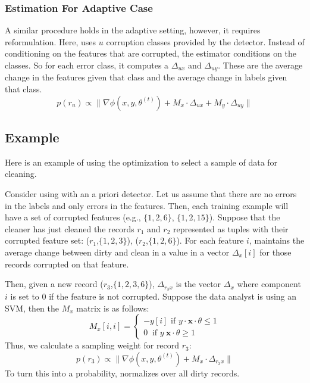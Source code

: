 \subsubsection{Estimation For Adaptive Case}
A similar procedure holds in the adaptive setting, however, it requires reformulation.
Here, \sys uses $u$ corruption classes provided by the detector.
Instead of conditioning on the features that are corrupted, the estimator conditions on the classes.
So for each error class, it computes a $\Delta_{ux}$ and $\Delta_{uy}$.
These are the average change in the features given that class and the average change in labels given that class.
\[
p(r_u)\propto\|\nabla\phi(x,y,\theta^{(t)}) + M_x \cdot \Delta_{ux} +  M_y \cdot \Delta_{uy}\|
\] 

\subsection{Example}
Here is an example of using the optimization to select a sample of data for cleaning.
\begin{example}
Consider using \sys with an a priori detector.
Let us assume that there are no errors in the labels and only errors in the features.
Then, each training example will have a set of corrupted features (e.g., $\{1,2,6\}$, $\{1,2,15\}$).
Suppose that the cleaner has just cleaned the records $r_1$ and $r_2$ represented as tuples with their corrupted feature set: ($r_1$,$\{1,2,3\}$), ($r_2$,$\{1,2,6\}$).
For each feature $i$, \sys maintains the average change between dirty and clean in a value in a vector $\Delta_x[i]$ for those records corrupted on that feature. 

Then, given a new record ($r_3$,$\{1,2,3,6\}$), $\Delta_{r_3x}$ is the vector $\Delta_x$ where component $i$ is set to 0 if the feature is not corrupted.
Suppose the data analyst is using an SVM, then the $M_x$ matrix is as follows:
\[
M_x[i,i] = \begin{cases}      
-y[i] \text{ if } y\cdot\boldsymbol{x}\cdot\theta \le 1 \\
0\ \text{ if } y\ \boldsymbol{x}\cdot\theta \geq 1      
\end{cases} 
\]
Thus, we calculate a sampling weight for record $r_3$:
\[
p(r_3) \propto\|\nabla\phi(x,y,\theta^{(t)}) + M_x \cdot \Delta_{r_3x} \|
\] 
To turn this into a probability, \sys normalizes over all dirty records.
\end{example}

